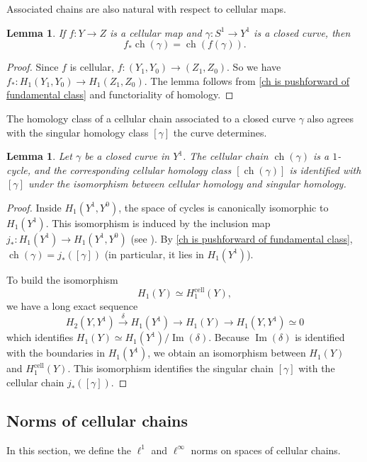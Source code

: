 \documentclass[12pt]{amsart}
\DeclareMathOperator*{\im}{Im}
\DeclareMathOperator*{\ch}{ch}
\DeclareMathOperator*{\cell}{cell}
\newtheorem{lemma}[theorem]{Lemma}
\theoremstyle{definition}
\begin{document}
Associated chains are also natural with respect to cellular maps.

\begin{lemma}\label{ch is natural} If $f:Y\to Z$ is a cellular map and $\gamma:S^1\to Y^1$ is a closed curve, then $$f_*\ch(\gamma)=\ch(f(\gamma)).$$
\end{lemma}

\begin{proof} Since $f$ is cellular, $f:(Y_1,Y_0)\to (Z_1,Z_0)$. So we have $f_*:H_1(Y_1,Y_0)\to H_1(Z_1,Z_0)$. The lemma follows from \cref{ch is pushforward of fundamental class} and functoriality of homology.
\end{proof}

The homology class of a cellular chain associated to a closed curve $\gamma$ also agrees with the singular homology class $[\gamma]$ the curve determines. 

\begin{lemma}\label{hom of ch} Let $\gamma$ be a closed curve in $Y^1$. The cellular chain $\ch(\gamma)$ is a $1$-cycle, and the corresponding cellular homology class $[\ch(\gamma)]$ is identified with $[\gamma]$ under the isomorphism between cellular homology and singular homology.
\end{lemma}

\begin{proof} Inside $H_1(Y^1,Y^0)$, the space of cycles is canonically isomorphic to $H_1(Y^1)$. This isomorphism is induced by the inclusion map $j_*:H_1(Y^1)\to H_1(Y^1,Y^0)$ (see \cite[Theorem 2.35]{Hat02}). By \cref{ch is pushforward of fundamental class}, $\ch(\gamma)=j_*([\gamma])$ (in particular, it lies in $H_1(Y^1)$). 

To build the isomorphism $$H_1(Y)\simeq H_1^{\cell}(Y),$$ we have a long exact sequence
$$H_2(Y,Y^1)\overset{\delta}\to H_1(Y^1)\to H_1(Y)\to H_1(Y,Y^1)\simeq 0$$ which identifies $H_1(Y)\simeq H_1(Y^1)/\im(\delta)$. Because $\im(\delta)$ is identified with the boundaries in $H_1(Y^1)$, we obtain an isomorphism between $H_1(Y)$ and $H_1^{\cell}(Y)$. This isomorphism identifies the singular chain $[\gamma]$ with the cellular chain $j_*([\gamma])$.
\end{proof}

\subsection{Norms of cellular chains}

In this section, we define the $\ell^1$ and $\ell^\infty$ norms on spaces of cellular chains.
\end{document}
